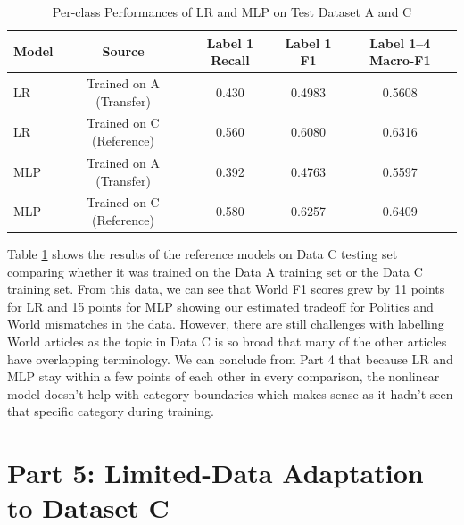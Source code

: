 \documentclass[letterpaper,conference,compsoc,onecolumn]{IEEEtran}
\begin{document}
\begin{table}[h]
  \centering
  \caption{Per-class Performances of LR and MLP on Test Dataset A and C}
  \label{table:lr_mlp_tran_ref_metrics}
  \begin{tabular}{lcccc}
    \hline
    \textbf{Model} & \textbf{Source} & \textbf{Label 1 Recall} & \textbf{Label 1 F1} & \textbf{Label 1--4 Macro-F1}\\
    \hline
    LR & Trained on A (Transfer) & 0.430 & 0.4983 & 0.5608\\
    LR & Trained on C (Reference) & 0.560 & 0.6080 & 0.6316\\
    MLP & Trained on A (Transfer) & 0.392 & 0.4763 & 0.5597\\
    MLP & Trained on C (Reference) & 0.580 & 0.6257 & 0.6409\\
    \hline  
  \end{tabular}
\end{table}

Table \ref{table:lr_mlp_tran_ref_metrics} shows the results of the reference models on Data C testing set comparing whether it was trained on the Data A training set or the Data C training set. From this data, we can see that World F1 scores grew by 11 points  for LR and 15 points for MLP showing our estimated tradeoff for Politics and World mismatches in the data. However, there are still challenges with labelling World articles as the topic in Data C is so broad that many of the other articles have overlapping terminology.
We can conclude from Part 4 that because LR and MLP stay within a few points of each other in every comparison, the nonlinear model doesn't help with category boundaries which makes sense as it hadn't seen that specific category during training.

\section{Part 5: Limited-Data Adaptation to Dataset C}
\end{document}
